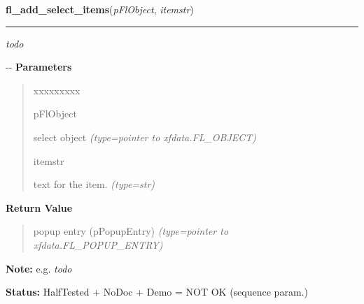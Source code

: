 \hspace{.8\funcindent}\begin{boxedminipage}{\funcwidth}

    \raggedright \textbf{fl\_add\_select\_items}(\textit{pFlObject}, \textit{itemstr})

    \vspace{-1.5ex}

    \rule{\textwidth}{0.5\fboxrule}
\setlength{\parskip}{2ex}

\emph{todo}

-{}-
\setlength{\parskip}{1ex}
      \textbf{Parameters}
      \vspace{-1ex}

      \begin{quote}
        \begin{Ventry}{xxxxxxxxx}

          \item[pFlObject]


select object
            {\it (type=pointer to xfdata.FL\_OBJECT)}

          \item[itemstr]


text for the item.
            {\it (type=str)}

        \end{Ventry}

      \end{quote}

      \textbf{Return Value}
    \vspace{-1ex}

      \begin{quote}

popup entry (pPopupEntry)
      {\it (type=pointer to xfdata.FL\_POPUP\_ENTRY)}

      \end{quote}

\textbf{Note:} 
e.g. \emph{todo}


\textbf{Status:} 
HalfTested + NoDoc + Demo = NOT OK (sequence param.)


    \end{boxedminipage}

    \label{xformslib:flselect:fl_insert_select_items}

    \vspace{0.5ex}

